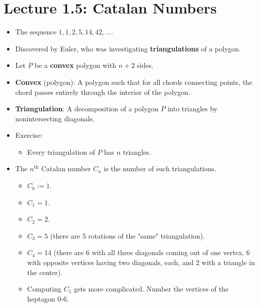 \documentclass[../main.tex]{subfiles}
\begin{document}
\section{Lecture 1.5: Catalan Numbers}
\begin{itemize}
    \item {}The sequence $1,1,2,5,14,42,\dots$.
    \item Discovered by Euler, who was investigating \textbf{triangulations} of a polygon.
    \item Let $P$ be a \textbf{convex} polygon with $n+2$ sides.
    \item \textbf{Convex} (polygon): A polygon such that for all chords connecting points, the chord passes entirely through the interior of the polygon.
    \item \textbf{Triangulation}: A decomposition of a polygon $P$ into triangles by nonintersecting diagonals.
    \item Exercise:
    \begin{itemize}
        \item Every triangulation of $P$ has $n$ triangles.
    \end{itemize}
    \item The $n^\text{th}$ Catalan number $C_n$ is the number of such triangulations.
    \begin{itemize}
        \item $C_0:=1$.
        \item $C_1=1$.
        \item $C_2=2$.
        \item $C_3=5$ (there are 5 rotations of the "same" triangulation).
        \item $C_4=14$ (there are 6 with all three diagonals coming out of one vertex, 6 with opposite vertices having two diagonals, each, and 2 with a triangle in the center).
        \item Computing $C_5$ gets more complicated. Number the vertices of the heptagon 0-6.
        \begin{figure}[h!]
            \centering
            \begin{subfigure}[b]{0.24\linewidth}
                \centering
\end{subfigure}
\end{figure}
\end{itemize}
\end{itemize}
\end{document}
